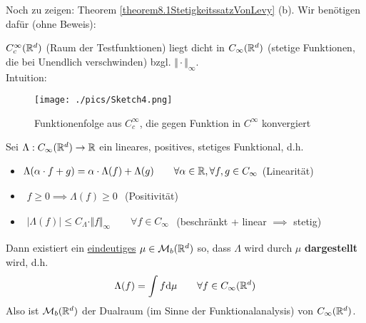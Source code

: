 Noch zu zeigen: Theorem \ref{theorem8.1StetigkeitssatzVonLevy} (b). 
Wir benötigen dafür (ohne Beweis):

\begin{lemma}\label{lemma8.2}
	$C_c^\infty(\mathbb{R}^d)$ (Raum der Testfunktionen) liegt dicht in $C_\infty(\mathbb{R}^d)$ (stetige Funktionen, die bei Unendlich verschwinden) bzgl. $\Vert\cdot\Vert_\infty$.\\
	Intuition:

	\begin{figure}[H]
		\begin{center}
	 		\texttt{[image: ./pics/Sketch4.png]}
	 		\caption{Funktionenfolge aus $C^\infty_c$, die gegen Funktion in $C^\infty$ konvergiert}
	 		\label{AbbTestfunktionenDicht}
	 	\end{center}
	\end{figure}
\end{lemma}

\begin{theorem}\label{theorem8.4RieszscherDarstellungssatzFuerM_b}\enter
	Sei $\Lambda:C_\infty(\mathbb{R}^d)\to\mathbb{R}$ ein lineares, positives, stetiges Funktional, d.h.
	\begin{itemize}
		\item $\begin{aligned}
			\Lambda(\alpha\cdot f+g)=\alpha\cdot\Lambda(f)+\Lambda(g)\qquad\forall\alpha\in\mathbb{R},\forall f,g\in C_\infty
		\end{aligned}$ (Linearität)
		\item $\begin{aligned}
			f\geq0\implies\Lambda(f)\geq0
		\end{aligned}$ (Positivität)
		\item $\begin{aligned}
			\big|\Lambda(f)\big|\leq C_\Lambda\cdot\Vert f\Vert_\infty\qquad\forall f\in C_\infty
		\end{aligned}$ (beschränkt + linear $\implies$ stetig)
	\end{itemize} 
	Dann existiert ein \underline{eindeutiges} $\mu\in\mathcal{M}_b(\mathbb{R}^d)$ so, dass $\Lambda$ wird durch $\mu$ \textbf{dargestellt} wird, d.h.
	\begin{align*}
		\Lambda(f)=\int\limits f\mathrm{d}\mu\qquad\forall f\in C_\infty(\mathbb{R}^d)
	\end{align*}
	Also ist $\mathcal{M}_b(\mathbb{R}^d)$ der Dualraum (im Sinne der Funktionalanalysis) von $C_\infty(\mathbb{R}^d)$.
\end{theorem}

